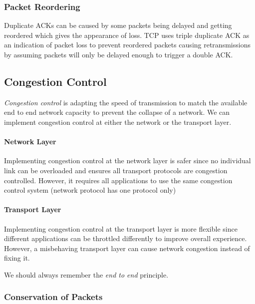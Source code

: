 \subsubsection{Packet Reordering}\label{ssub:packet_reordering}

Duplicate ACKs can be caused by some packets being delayed and getting reordered which gives the appearance of loss.
TCP uses triple duplicate ACK as an indication of packet loss to prevent reordered packets causing retransmissions by assuming packets will only be delayed enough to trigger a double ACK.

\subsection{Congestion Control}\label{sub:congestion_control}

\emph{Congestion control} is adapting the speed of transmission to match the available end to end network capacity to prevent the collapse of a network.
We can implement congestion control at either the network or the transport layer.

\paragraph{Network Layer}\label{par:network_layer}

Implementing congestion control at the network layer is safer since no individual link can be overloaded and ensures all transport protocols are congestion controlled.
However, it requires all applications to use the same congestion control system (network protocol has one protocol only)

\paragraph{Transport Layer}\label{par:transport_layer}

Implementing congestion control at the transport layer is more flexible since different applications can be throttled differently to improve overall experience.
However, a misbehaving transport layer can cause network congestion instead of fixing it.

\begin{note}
    We should always remember the \emph{end to end} principle.
\end{note}

\subsubsection{Conservation of Packets}\label{ssub:conservation_of_packets}

